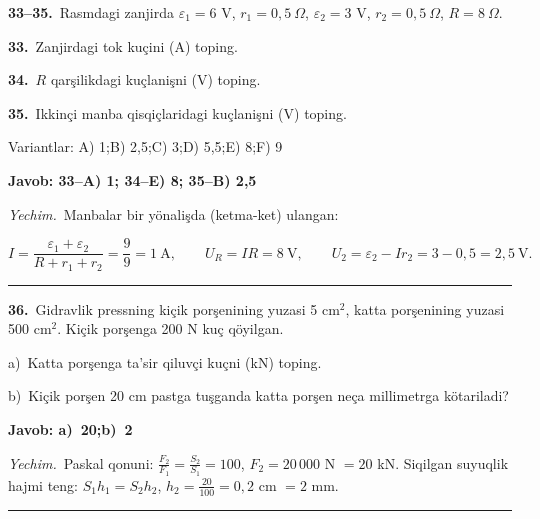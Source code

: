 \documentclass[11pt,a4paper]{article}
\begin{document}
\newpage\noindent\textbf{33–35.}\ Rasmdagi zanjirda $\varepsilon_1=6$ V, $r_1=0,5\ \Omega$, $\varepsilon_2=3$ V, $r_2=0,5\ \Omega$, $R=8\ \Omega$.\par\medskip
\begin{center}\end{center}
\noindent\textbf{33.}\ Zanjirdagi tok kuçini (A) toping.\par
\noindent\textbf{34.}\ $R$ qarşilikdagi kuçlanişni (V) toping.\par
\noindent\textbf{35.}\ Ikkinçi manba qisqiçlaridagi kuçlanişni (V) toping.\par
\noindent Variantlar: A) 1;\quad B) 2,5;\quad C) 3;\quad D) 5,5;\quad E) 8;\quad F) 9\par\smallskip
\noindent\colorbox{gray!12}{\parbox{\dimexpr\linewidth-2\fboxsep}{\textbf{Javob: 33--A) 1; 34--E) 8; 35--B) 2,5}}}\par\smallskip
\noindent\textit{Yechim.}\ Manbalar bir yönalişda (ketma-ket) ulangan:\par
\[I=\frac{\varepsilon_1+\varepsilon_2}{R+r_1+r_2}=\frac{9}{9}=1\ \text{A},\qquad U_R=IR=8\ \text{V},\qquad U_2=\varepsilon_2-Ir_2=3-0{,}5=2{,}5\ \text{V}.\]\par\medskip\hrule\medskip
{}\noindent\textbf{36.}\ Gidravlik pressning kiçik porşenining yuzasi 5 cm$^2$, katta porşenining yuzasi 500 cm$^2$. Kiçik porşenga 200 N kuç qöyilgan.\par
\noindent\hspace*{4mm}a)\ Katta porşenga ta’sir qiluvçi kuçni (kN) toping.\par
\noindent\hspace*{4mm}b)\ Kiçik porşen 20 cm pastga tuşganda katta porşen neça millimetrga kötariladi?\par
\noindent\colorbox{gray!12}{\parbox{\dimexpr\linewidth-2\fboxsep}{\textbf{Javob: a)\ 20;\quad b)\ 2}}}\par\smallskip
\noindent\textit{Yechim.}\ Paskal qonuni: $\frac{F_2}{F_1}=\frac{S_2}{S_1}=100$, $F_2=20\,000$ N $=20$ kN. Siqilgan suyuqlik hajmi teng: $S_1h_1=S_2h_2$, $h_2=\frac{20}{100}=0{,}2$ cm $=2$ mm.\par\par\medskip\hrule\medskip
\end{document}

